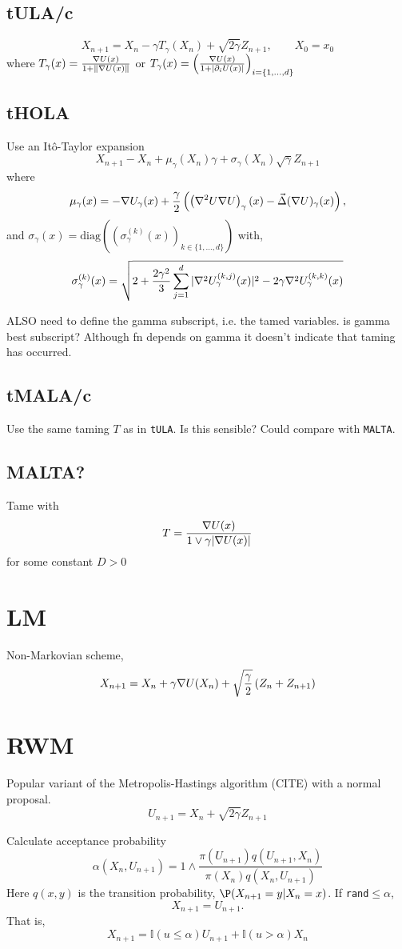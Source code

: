 \subsection{tULA/c}
\[X_{n+1} = X_n -\gamma T_{\gamma}(X_n) +\sqrt{2\gamma} Z_{n+1},\qquad X_0= x_0 \]
where \(T_{\gamma}(x) = \frac{\nabla U(x)}{1+\|\nabla U(x)\|}\) or \(T_{\gamma}(x) =\left(\frac{\nabla U(x)}{1+|\partial_i U(x)|}\right)_{i=\lbrace 1, \dots, d\rbrace} \)
\subsection{tHOLA}
\cite{tHOLA}
Use an It\^o-Taylor expansion 
\[X_{n+1} - X_n + \mu_{\gamma}(X_n)\gamma +\sigma_{\gamma}(X_n)\sqrt{\gamma}Z_{n+1}\]
where 
\[\mu_{\gamma}(x) = -\nabla U_{\gamma}(x) +\frac{\gamma}{2}\left( \left( \nabla^2U\nabla U\right)_{\gamma}(x) - \vec{\Delta}(\nabla U)_{\gamma}(x)\right) ,\]
and \(\sigma_{\gamma}(x) = \text{diag}\left(\left( \sigma_{\gamma}^{(k)}(x)\right)_{k\in \lbrace 1,\dots,d\rbrace}\right)\) with,
\[\sigma_{\gamma}^{(k)}(x) = \sqrt{2+\frac{2\gamma^2}{3}\sum_{j=1}^d |\nabla^2 U_{\gamma}^{(k,j)}(x)|^2 - 2\gamma \nabla^2 U_{\gamma}^{(k,k)}(x)}\]

ALSO need to define the gamma subscript, i.e. the tamed variables. is gamma best subscript? Although fn depends on gamma it doesn't indicate that taming has occurred.
\subsection{tMALA/c}
Use the same taming \(T\) as in \texttt{tULA}. Is this sensible? Could compare with \texttt{MALTA}.
\subsection{MALTA?}\cite{MALTA}
Tame with 
\[T = \frac{ \nabla U(x)}{1\vee \gamma |\nabla U(x)|}\]
for some constant \(D>0\)
\section{LM}
\cite{LM}
Non-Markovian scheme,
\[X_{n+1} = X_n +\gamma \nabla U(X_n) + \sqrt{\frac{\gamma}{2}} \left(Z_n + Z_{n+1}\right) \]
\section{RWM}
Popular variant of the Metropolis-Hastings algorithm (CITE) with a normal proposal. 
\[U_{n+1} = X_n + \sqrt{2\gamma} Z_{n+1}\]

Calculate acceptance probability
\[\alpha(X_n,U_{n+1}) = 1\wedge \frac{\pi(U_{n+1})q(U_{n+1},X_n)}{\pi(X_n)q(X_n,U_{n+1})}\]
Here \(q(x,y)\) is the transition probability, \(\P(X_{n+1}=y | X_{n}=x)\). If \texttt{rand}\(\leq\alpha\), 
\[X_{n+1} = U_{n+1}.\]
That is,
\[X_{n+1} = \mathbb{I}(u\leq \alpha)U_{n+1} +\mathbb{I}(u > \alpha)X_n \] 


